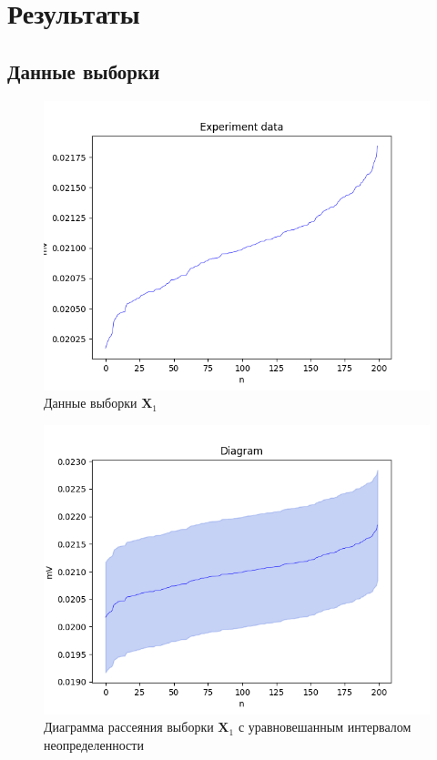 \section{Результаты}

\subsection{Данные выборки}

\begin{figure}[ht]
	\begin{center}
		\includegraphics[scale = 0.55]{../images/data.png}
	\end{center}
	\caption{Данные выборки $\bm{X}_1$}
\end{figure}

\begin{figure}[ht]
	\begin{center}
		\includegraphics[scale = 0.55]{../images/diagram_beta_None.png}
	\end{center}
	\caption{Диаграмма рассеяния выборки $\bm{X}_1$ с уравновешанным интервалом неопределенности}
\end{figure}

